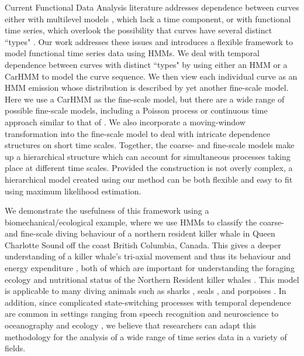

Current Functional Data Analysis literature addresses dependence between curves either with multilevel models \citep{Chen:2012,Di:2009}, which lack a time component, or with functional time series, which overlook the possibility that curves have several distinct ``types" \citep{Kokoszka:2018}. Our work addresses these issues and introduces a flexible framework to model functional time series data using HMMs.
We deal with temporal dependence between curves with distinct ``types" by using either an HMM or a CarHMM to model the curve sequence. We then view each individual curve as an HMM emission whose distribution is described by yet another fine-scale model. Here we use a CarHMM as the fine-scale model, but there are a wide range of possible fine-scale models, including a Poisson process or continuous time approach similar to that of \citet{Michelot:2019}. We also incorporate a moving-window transformation into the fine-scale model to deal with intricate dependence structures on short time scales. Together, the coarse- and fine-scale models make up a hierarchical structure which can account for simultaneous processes taking place at different time scales. Provided the construction is not overly complex, a hierarchical model created using our method can be both flexible and easy to fit using maximum likelihood estimation.

We demonstrate the usefulness of this framework using a biomechanical/ecological example, where we use HMMs to classify the coarse- and fine-scale diving behaviour of a northern resident killer whale in Queen Charlotte Sound off the coast British Columbia, Canada. This gives a deeper understanding of a killer whale's tri-axial movement and thus its behaviour and energy expenditure \citep{Gleiss:2011,Qasem:2012}, both of which are important for understanding the foraging ecology and nutritional status of the Northern Resident killer whales \citep{Noren:2011}. This model is applicable to many diving animals such as sharks \citep{Adam:2019}, seals \citep{Dot:2016}, and porpoises \citep{Barajas:2017}. In addition, since complicated state-switching processes with temporal dependence are common in settings ranging from speech recognition \citep{Juang:1991} and neuroscience \citep{Langrock:2013} to oceanography \citep{Bulla:2012} and ecology \citep{Adam:2019}, we believe that researchers can adapt this methodology for the analysis of a wide range of time series data in a variety of fields.

